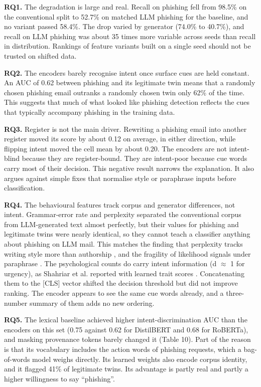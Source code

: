 \documentclass[11pt,letterpaper]{article}
\begin{document}
\textbf{RQ1.} The degradation is large and real. Recall on phishing fell from 98.5\% on the conventional split to 52.7\% on matched LLM phishing for the baseline, and no variant passed 58.4\%. The drop varied by generator (74.0\% to 40.7\%), and recall on LLM phishing was about 35 times more variable across seeds than recall in distribution. Rankings of feature variants built on a single seed should not be trusted on shifted data.

\textbf{RQ2.} The encoders barely recognise intent once surface cues are held constant. An AUC of 0.62 between phishing and its legitimate twin means that a randomly chosen phishing email outranks a randomly chosen twin only 62\% of the time. This suggests that much of what looked like phishing detection reflects the cues that typically accompany phishing in the training data.

\textbf{RQ3.} Register is not the main driver. Rewriting a phishing email into another register moved its score by about 0.12 on average, in either direction, while flipping intent moved the cell mean by about 0.20. The encoders are not intent-blind because they are register-bound. They are intent-poor because cue words carry most of their decision. This negative result narrows the explanation. It also argues against simple fixes that normalise style or paraphrase inputs before classification.

\textbf{RQ4.} The behavioural features track corpus and generator differences, not intent. Grammar-error rate and perplexity separated the conventional corpus from LLM-generated text almost perfectly, but their values for phishing and legitimate twins were nearly identical, so they cannot teach a classifier anything about phishing on LLM mail. This matches the finding that perplexity tracks writing style more than authorship \cite{liang2023}, and the fragility of likelihood signals under paraphrase \cite{sadasivan2023,krishna2023}. The psychological counts do carry intent information (d $\approx$ 1 for urgency), as Shahriar et al. reported with learned trait scores \cite{shahriar2022}. Concatenating them to the [CLS] vector shifted the decision threshold but did not improve ranking. The encoder appears to see the same cue words already, and a three-number summary of them adds no new ordering.

\textbf{RQ5.} The lexical baseline achieved higher intent-discrimination AUC than the encoders on this set (0.75 against 0.62 for DistilBERT and 0.68 for RoBERTa), and masking provenance tokens barely changed it (Table 10). Part of the reason is that its vocabulary includes the action words of phishing requests, which a bag-of-words model weighs directly. Its learned weights also encode corpus identity, and it flagged 41\% of legitimate twins. Its advantage is partly real and partly a higher willingness to say ``phishing''.
\end{document}
